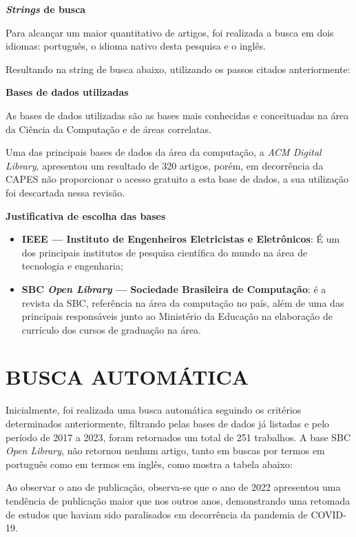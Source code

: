 \textbf{\textit{Strings} de busca}

Para alcançar um maior quantitativo de artigos, foi realizada a busca em dois idiomas: português, o idioma nativo desta pesquisa e o inglês.


Resultando na string de busca abaixo, utilizando os passos citados anteriormente:




\textbf{Bases de dados utilizadas}

As bases de dados utilizadas são as bases mais conhecidas e conceituadas na área da Ciência da Computação e de áreas correlatas.



Uma das principais bases de dados da área da computação, a \textit{\gls{ACM} Digital Library}, apresentou um resultado de 320 artigos, porém, em decorrência da \gls{CAPES} não proporcionar o acesso gratuito a esta base de dados, a sua utilização foi descartada nessa revisão.


\textbf{Justificativa de escolha das bases}
\begin{itemize}
    \item \textbf{IEEE — Instituto de Engenheiros Eletricistas e Eletrônicos}: É um dos principais institutos de pesquisa científica do mundo na área de tecnologia e engenharia;
    \item \textbf{SBC \textit{Open Library} — Sociedade Brasileira de Computação}: é a revista da \gls{SBC}, referência na área da computação no país, além de uma das principais responsáveis junto ao Ministério da Educação na elaboração de currículo dos cursos de graduação na área.
\end{itemize}


\section{BUSCA AUTOMÁTICA}
Inicialmente, foi realizada uma busca automática seguindo os critérios determinados anteriormente, filtrando pelas bases de dados já listadas e pelo período de 2017 a 2023, foram retornados um total de 251 trabalhos. A base SBC \textit{Open Library}, não retornou nenhum artigo, tanto em buscas por termos em português como em termos em inglês, como mostra a tabela abaixo: 



Ao observar o ano de publicação, observa-se que o ano de 2022 apresentou uma tendência de publicação maior que nos outros anos,  demonstrando uma retomada de estudos que haviam sido paralisados em decorrência da pandemia de COVID-19.

